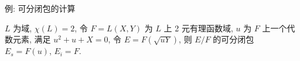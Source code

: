 
\begin{frame}{例: 可分闭包的计算}

\begin{eg}
$L$ 为域, $\chi(L) = 2$, 令 $F = L(X, Y)$ 为 $L$ 上 2 元有理函数域,
$u$ 为 $F$ 上一个代数元素, 满足 $u^2 + u + X = 0$,
令 $E = F(\sqrt{uY})$, 则 $E/F$ 的可分闭包 $E_s = F(u)$, $E_i = F$.
\end{eg}

\end{frame}



